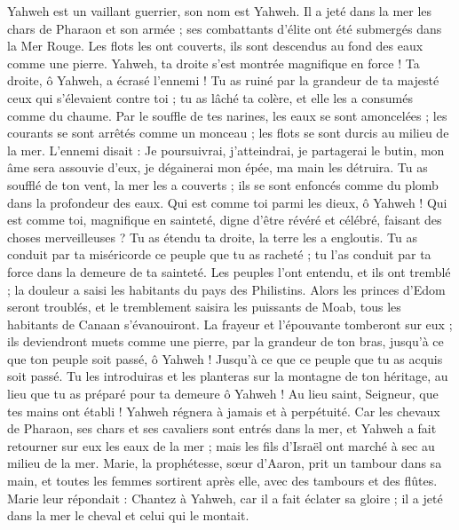 \begin{multicols}{2}
Yahweh est un vaillant guerrier, son nom est Yahweh.
Il a jeté dans la mer les chars de Pharaon et son armée ; ses combattants d’élite ont été submergés dans la Mer Rouge.
Les flots les ont couverts, ils sont descendus au fond des eaux comme une pierre.
Yahweh, ta droite s'est montrée magnifique en force ! Ta droite, ô Yahweh, a écrasé l'ennemi !
Tu as ruiné par la grandeur de ta majesté ceux qui s'élevaient contre toi ; tu as lâché ta colère, et elle les a consumés comme du chaume.
Par le souffle de tes narines, les eaux se sont amoncelées ; les courants se sont arrêtés comme un monceau ; les flots se sont durcis au milieu de la mer.
L'ennemi disait : Je poursuivrai, j'atteindrai, je partagerai le butin, mon âme sera assouvie d'eux, je dégainerai mon épée, ma main les détruira.
Tu as soufflé de ton vent, la mer les a couverts ; ils se sont enfoncés comme du plomb dans la profondeur des eaux.
Qui est comme toi parmi les dieux, ô Yahweh ! Qui est comme toi, magnifique en sainteté, digne d'être révéré et célébré, faisant des choses merveilleuses ?
Tu as étendu ta droite, la terre les a engloutis.
Tu as conduit par ta miséricorde ce peuple que tu as racheté ; tu l'as conduit par ta force dans la demeure de ta sainteté.
Les peuples l'ont entendu, et ils ont tremblé ; la douleur a saisi les habitants du pays des Philistins.
Alors les princes d'Edom seront troublés, et le tremblement saisira les puissants de Moab, tous les habitants de Canaan s’évanouiront.
La frayeur et l'épouvante tomberont sur eux ; ils deviendront muets comme une pierre, par la grandeur de ton bras, jusqu'à ce que ton peuple soit passé, ô Yahweh ! Jusqu'à ce que ce peuple que tu as acquis soit passé.
Tu les introduiras et les planteras sur la montagne de ton héritage, au lieu que tu as préparé pour ta demeure ô Yahweh ! Au lieu saint, Seigneur, que tes mains ont établi !
Yahweh régnera à jamais et à perpétuité.
Car les chevaux de Pharaon, ses chars et ses cavaliers sont entrés dans la mer, et Yahweh a fait retourner sur eux les eaux de la mer ; mais les fils d'Israël ont marché à sec au milieu de la mer.
Marie, la prophétesse, sœur d'Aaron, prit un tambour dans sa main, et toutes les femmes sortirent après elle, avec des tambours et des flûtes.
Marie leur répondait : Chantez à Yahweh, car il a fait éclater sa gloire ; il a jeté dans la mer le cheval et celui qui le montait.

\end{multicols}
